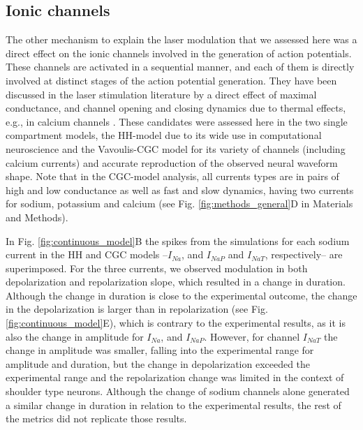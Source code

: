 \subsection{Ionic channels}
The other mechanism to explain the laser modulation that we assessed here was a direct effect on the ionic channels involved in the generation of action potentials. These channels are activated in a sequential manner, and each of them is directly involved at distinct stages of the action potential generation. They have been discussed in the laser stimulation literature \cite{Liang2009,Li2013, Rabbitt2016} by a direct effect of maximal conductance, and channel opening and closing dynamics due to thermal effects, e.g., in calcium channels \cite{Albert2012, Barrett2018}. These candidates were assessed here in the two single compartment models, the HH-model due to its wide use in computational neuroscience and the Vavoulis-CGC model for its variety of channels (including calcium currents) and accurate reproduction of the observed neural waveform shape. Note that in the CGC-model analysis, all currents types are in pairs of high and low conductance as well as fast and slow dynamics, having two currents for sodium, potassium and calcium (see Fig. \ref{fig:methods_general}D in Materials and Methods).

In Fig. \ref{fig:continuous_model}B the spikes from the simulations for each sodium current in the HH and CGC models --$I_{Na}$, and $I_{NaP}$ and $I_{NaT}$, respectively-- are superimposed. For the three currents, we observed modulation in both depolarization and repolarization slope, which resulted in a change in duration. Although the change in duration is close to the experimental outcome, the change in the depolarization is larger than in repolarization (see Fig. \ref{fig:continuous_model}E), which is contrary to the experimental results, as it is also the change in amplitude for $I_{Na}$, and $I_{NaP}$. However, for channel $I_{NaT}$ the change in amplitude was smaller, falling into the experimental range for amplitude and duration, but the change in depolarization exceeded the experimental range and the repolarization change was limited in the context of shoulder type neurons. Although the change of sodium channels alone generated a similar change in duration in relation to the experimental results, the rest of the metrics did not replicate those results.


